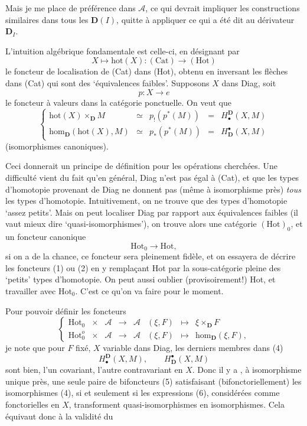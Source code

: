 \documentclass[11pt]{article}
\newcommand{\printedpage}[1]{\marginpar{\footnotesize p.~#1}}
\newcommand{\msp}[1]{\marginpar{\footnotesize [#1]}}
\newcommand{\Hot}{\mathrm{Hot}}
\newcommand{\D}{\mathbf{D}}
\newcommand{\hm}{\mathrm{hom}}
\begin{document}
Mais je me place de préférence dans $\mathcal{A}$, ce qui devrait impliquer les constructions similaires dans tous les $\D(I)$, quitte à appliquer ce qui a été dit au dérivateur $\D_I$.

L'intuition algébrique fondamentale est celle-ci, en désignant par
\[
X \longmapsto \mathrm{hot}(X) : (\mathrm{Cat}) \longrightarrow (\Hot)
\]
le foncteur de localisation de (Cat) dans (Hot), obtenu en inversant les flèches dans (Cat) qui sont des `équivalences faibles'. Supposons $X$ dans Diag, soit
\[
p : X \longrightarrow e
\]
le foncteur à valeurs dans la catégorie ponctuelle. On veut que
\[
\left\{
\begin{array}{rcccl}
\mathrm{hot}(X) \times_{\D} M & \simeq & p_!(p^*(M)) & = & H^{\D}_{\bullet}(X, M)\\
\hm_{\D}(\mathrm{hot}(X), M) & \simeq & p_*(p^*(M)) & = & H^{\bullet}_{\D}(X, M)
\end{array}
\right.
\tag*{(4)}
\]
(isomorphismes canoniques).

\msp{page 3}
Ceci donnerait un principe de définition pour les opérations cherchées. Une difficulté vient du fait qu'en général, Diag n'est pas égal à (Cat), et que les types d'homotopie provenant de Diag ne donnent pas (même à isomorphisme près) \textit{tous} les types d'homotopie. Intuitivement, on ne trouve que des types d'homotopie `assez petits'. Mais on peut localiser Diag par rapport aux équivalences faibles (il vaut mieux dire `quasi-isomorphismes'), on trouve alors une catégorie $(\Hot)_0$, et un foncteur canonique
\[
\Hot_0 \longrightarrow \Hot,
\]
si on a de la chance, ce foncteur sera pleinement fidèle, et on essayera de décrire les foncteurs (1) ou (2) en y remplaçant Hot par la sous-catégorie pleine des `petits' types d'homotopie. On peut aussi oublier (provisoirement!) Hot, et travailler avec $\Hot_0$. C'est ce qu'on va faire pour le moment.

Pour pouvoir définir les foncteurs
\[
\left\{
\begin{array}{lccccccl}
\Hot_0 & \times & \mathcal{A} & \longrightarrow & \mathcal{A} & (\xi, F) & \longmapsto & \xi \times_{\D} F\\
\Hot_0^o & \times & \mathcal{A} & \longrightarrow & \mathcal{A} & (\xi, F) & \longmapsto & \hm_{\D}(\xi, F),
\end{array}
\right.
\tag*{(5)}
\]
je note que pour $F$ fixé, $X$ variable dans Diag, les
\printedpage{3}
\msp{page 4}
derniers membres dans (4)
\[
H^{\D}_{\bullet}(X, M), \qquad H^{\bullet}_{\D}(X, M)
\tag*{(6)}
\]
sont bien, l'un covariant, l'autre contravariant en $X$. Donc il y a , à isomorphisme unique près, une seule paire de bifoncteurs (5) satisfaisant (bifonctoriellement) les isomorphismes (4), si et seulement si les expressions (6), considérées comme fonctorielles en $X$, transforment quasi-isomorphismes en isomorphismes. Cela équivaut donc à la validité du %
\end{document}
